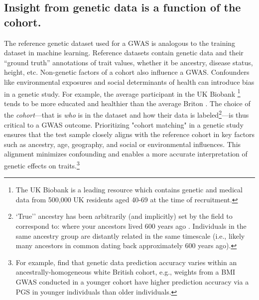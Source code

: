 \subsection{Insight from genetic data is a function of the cohort.}
The reference genetic dataset used for a GWAS is analogous to the training dataset in machine learning. Reference datasets contain genetic data and their ``ground truth'' annotations of trait values, whether it be ancestry, disease status, height, etc. Non-genetic factors of a cohort also influence a GWAS. Confounders like environmental exposures and social determinants of
health can introduce bias in a genetic study. For example, the average participant in the UK Biobank \footnote{The UK Biobank is a leading resource which contains genetic and medical data from 500,000 UK residents aged 40-69 at the time of recruitment.} tends to be more educated and healthier than the average Briton \cite{fry_comparison_2017}. The choice of the \emph{cohort}—that is \emph{who} is in the dataset and how their data is labeled\footnote{`True'' ancestry has been arbitrarily (and implicitly) set by the field to correspond to: where your ancestors lived 600 years ago \cite{coop_genetic_2023}. Individuals in the same ancestry group are distantly related in the same timescale (i.e., likely many ancestors in common dating back approximately 600 years ago). }—is thus critical to a GWAS outcome. Prioritizing "cohort matching" in a genetic study ensures that the test sample closely aligns with the reference cohort in key factors such as ancestry, age, geography, and social or environmental influences. This alignment minimizes confounding and enables a more accurate interpretation of genetic effects on traits.\footnote{For example, \cite{mostafavi_variable_2020} find that genetic data prediction accuracy varies within an ancestrally-homogeneous white British cohort, e.g., weights from a BMI GWAS conducted in a younger cohort have higher prediction accuracy via a PGS in younger individuals than older individuals.}
